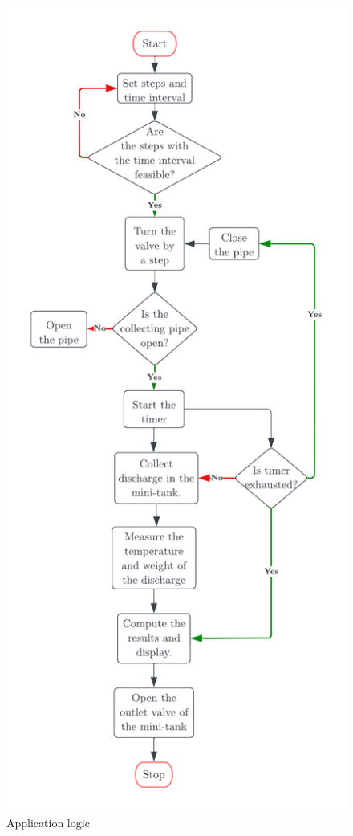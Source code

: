 \begin{figure}[H]
    \centering
    \includegraphics[width=\textwidth,height=\textheight,keepaspectratio]{Figures/Control_flow.png}
    \caption{Application logic}
    \label{fig:control_flow}
\end{figure}


